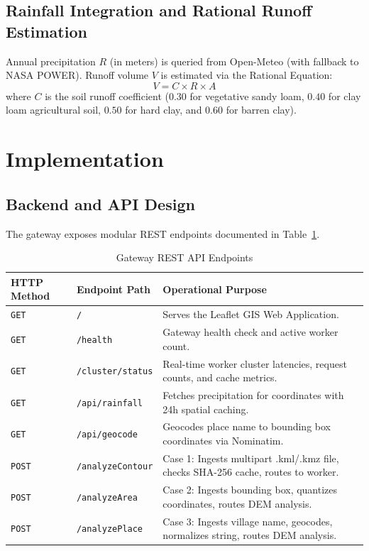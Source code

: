\documentclass[manuscript,screen,review]{acmart}
\begin{document}
\subsection{Rainfall Integration and Rational Runoff Estimation}
Annual precipitation $R$ (in meters) is queried from Open-Meteo (with fallback to NASA POWER). Runoff volume $V$ is estimated via the Rational Equation:
\begin{equation}
V = C \times R \times A
\end{equation}
where $C$ is the soil runoff coefficient ($0.30$ for vegetative sandy loam, $0.40$ for clay loam agricultural soil, $0.50$ for hard clay, and $0.60$ for barren clay).

\section{Implementation}
\label{sec:implementation}

\subsection{Backend and API Design}
The gateway exposes modular REST endpoints documented in Table~\ref{tab:api}.

\begin{table}[h]
  \caption{Gateway REST API Endpoints}
  \label{tab:api}
  \small
  \begin{tabular}{llp{7.5cm}}
    \toprule
    HTTP Method & Endpoint Path & Operational Purpose \\
    \midrule
    \texttt{GET} & \texttt{/} & Serves the Leaflet GIS Web Application. \\
    \texttt{GET} & \texttt{/health} & Gateway health check and active worker count. \\
    \texttt{GET} & \texttt{/cluster/status} & Real-time worker cluster latencies, request counts, and cache metrics. \\
    \texttt{GET} & \texttt{/api/rainfall} & Fetches precipitation for coordinates with 24h spatial caching. \\
    \texttt{GET} & \texttt{/api/geocode} & Geocodes place name to bounding box coordinates via Nominatim. \\
    \texttt{POST} & \texttt{/analyzeContour} & Case 1: Ingests multipart .kml/.kmz file, checks SHA-256 cache, routes to worker. \\
    \texttt{POST} & \texttt{/analyzeArea} & Case 2: Ingests bounding box, quantizes coordinates, routes DEM analysis. \\
    \texttt{POST} & \texttt{/analyzePlace} & Case 3: Ingests village name, geocodes, normalizes string, routes DEM analysis. \\
    \bottomrule
  \end{tabular}
\end{table}
\end{document}
